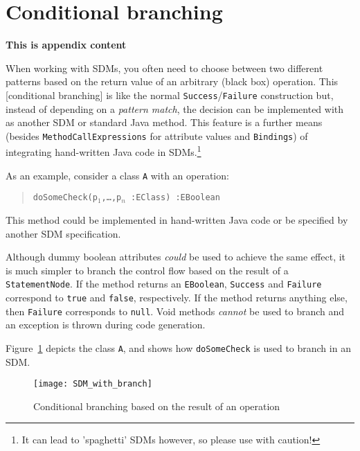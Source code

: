 \newpage
\section{Conditional branching}
\genHeader
\hypertarget{sec:conBran}{}

{\bf \large This is appendix content}

\vspace{1cm}

When working with SDMs, you often need to choose between two different patterns based on the return value of an arbitrary (black box) operation.
This [conditional branching] is like the normal \texttt{Success}/\texttt{Failure} construction but, instead of depending on a \emph{pattern match}, the decision
can be implemented with as another SDM or standard Java method. This feature is a further means (besides \texttt{MethodCallExpressions} for attribute values and
\texttt{Bindings}) of integrating hand-written Java code in SDMs.\footnote{It can lead to 'spaghetti' SDMs however, so please use with caution!}

As an example, consider a class \texttt{A} with an operation:
\begin{quote}
 \mbox{\texttt{doSomeCheck(p$_1$,\ldots,p$_n$ :EClass) :EBoolean}}
\end{quote}

This method could be implemented in hand-written Java code or be specified by another SDM specification.

Although dummy boolean attributes \emph{could} be used to achieve the same effect, it is much simpler to branch the control flow based on the result of a \texttt{StatementNode}.
If the method returns an \texttt{EBoolean}, \texttt{Success} and \texttt{Failure} correspond to \texttt{true} and \texttt{false}, respectively. If the method returns anything else, then \texttt{Failure} corresponds to \texttt{null}. Void methods \emph{cannot} be used to branch and an exception is thrown during code generation.

Figure~\ref{fig:cond_branch_on_op} depicts the class \texttt{A}, and shows how \texttt{doSomeCheck} is used to branch in an SDM.

\newpage

\vspace*{3cm}

\begin{figure}[htp]
\begin{center}
  \texttt{[image: SDM\_with\_branch]}
  \caption{Conditional branching based on the result of an operation}
  \label{fig:cond_branch_on_op}
\end{center}
\end{figure}







